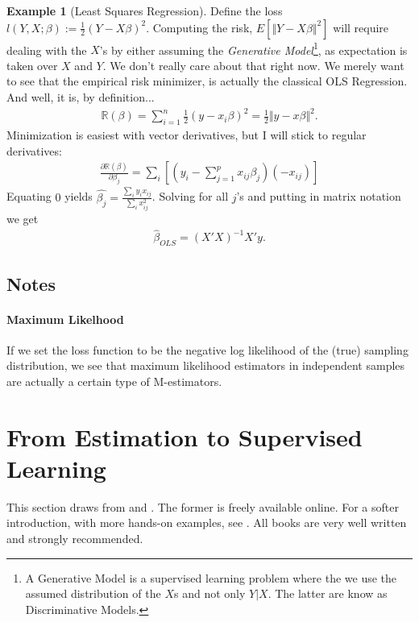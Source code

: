 \documentclass[12pt,a4paper]{article}
\theoremstyle{plain}
\theoremstyle{definition}
\newtheorem{example}{Example}
\newcommand{\expect}[1]{E\left[ #1 \right]}
\newcommand{\norm}[1]{\Vert #1 \Vert}
\newcommand{\loss}{l}
\newcommand{\riskn}{\mathbb{R}}
\newcommand{\deriv}[2]{\frac{\partial #1}{\partial #2}}
\begin{document}
\begin{example}[Least Squares Regression]
\label{eg:OLS}
Define the loss $\loss(Y,X;\beta):=\frac{1}{2}(Y-X\beta)^2$.
Computing the risk, $\expect{\norm{Y-X\beta}^2}$ will require dealing with the $X$'s by either assuming the \emph{Generative Model}\footnote{A Generative Model is a supervised learning problem where the we use the assumed distribution of the $X$s and not only $Y|X$. The latter are know as Discriminative Models.}, as expectation is taken over $X$ and $Y$. 
We don't really care about that right now. 
We merely want to see that the empirical risk minimizer, is actually the classical OLS Regression. And well, it is, by definition...
\begin{align*}
	\riskn(\beta)=\sum_{i=1}^n 	\frac{1}{2}(y-x_i\beta)^2 = \frac{1}{2}\norm{y-x\beta}^2.
\end{align*}
Minimization is easiest with vector derivatives, but I will stick to regular derivatives:
\begin{align*}
	\deriv{\riskn(\beta)}{{\beta_j}} = \sum_i \left[ (y_i-\sum_{j=1}^p x_{ij}\beta_j)(-x_{ij}) \right]
\end{align*}
Equating $0$ yields $\hat{\beta_j}=\frac{\sum_i y_i x_{ij}}{\sum_i x_{ij}^2}$.
Solving for all $j$'s and putting in matrix notation we get
\begin{align}
	\hat{\beta}_{OLS}=(X'X)^{-1} X'y.
\end{align}


\end{example}


\subsection{Notes}
\paragraph{Maximum Likelhood} 
If we set the loss function to be the negative log likelihood of the (true) sampling distribution, we see that maximum likelihood estimators in independent samples are actually a certain type of M-estimators.


\section{From Estimation to Supervised Learning}
\label{sec:learning}
This section draws from \cite{hastie_elements_2003} and \cite{shalev-shwartz_understanding_2014}.
The former is freely available online.
For a softer introduction, with more hands-on examples, see \cite{james_introduction_2013}.
All books are very well written and strongly recommended.
\end{document}

